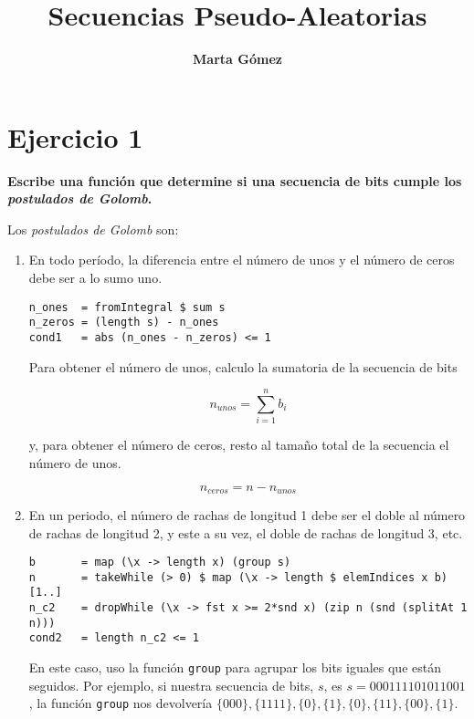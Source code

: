 \documentclass[10pt,spanish]{article}
\title{\fontfamily{pag}\selectfont \bfseries \Huge \color{azul} Secuencias Pseudo-Aleatorias}
\author{\fontfamily{pag}\selectfont \bfseries \LARGE Marta Gómez}
\begin{document}
\maketitle

\renewcommand{\tablename}{Tabla}

\section{\textcolor{azul}Ejercicio 1}
\textbf{Escribe una función que determine si una secuencia de bits cumple los \textit{\textcolor{azul}{postulados de Golomb}}.}

Los \textit{\textcolor{azul}{postulados de Golomb}} son:

\begin{enumerate}[1.]
\item En todo período, la diferencia entre el número de unos y el número de ceros debe ser a lo sumo uno.

\begin{verbatim}
n_ones  = fromIntegral $ sum s
n_zeros = (length s) - n_ones
cond1   = abs (n_ones - n_zeros) <= 1
\end{verbatim}

Para obtener el número de unos, calculo la sumatoria de la secuencia de bits 

\begin{displaymath}
    n_{unos} = \sum_{i=1}^n b_i
\end{displaymath}

y, para obtener el número de ceros, resto al tamaño total de la secuencia el número de unos.

\begin{displaymath}
    n_{ceros} = n - n_{unos}
\end{displaymath}

\item En un periodo, el número de rachas de longitud 1 debe ser el doble al número de rachas de longitud 2, y este a su vez, el doble de rachas de longitud 3, etc.

\begin{verbatim}
b       = map (\x -> length x) (group s)
n       = takeWhile (> 0) $ map (\x -> length $ elemIndices x b) [1..]
n_c2    = dropWhile (\x -> fst x >= 2*snd x) (zip n (snd (splitAt 1 n))) 
cond2   = length n_c2 <= 1
\end{verbatim}

En este caso, uso la función \texttt{group} para agrupar los bits iguales que están seguidos. Por ejemplo, si nuestra secuencia de bits, $s$, es $s=000111101011001$, la función \texttt{group} nos devolvería $\{000\},\{1111\},\{0\},\{1\},\{0\},\{11\},\{00\},\{1\}$.



\end{enumerate}
\end{document}
